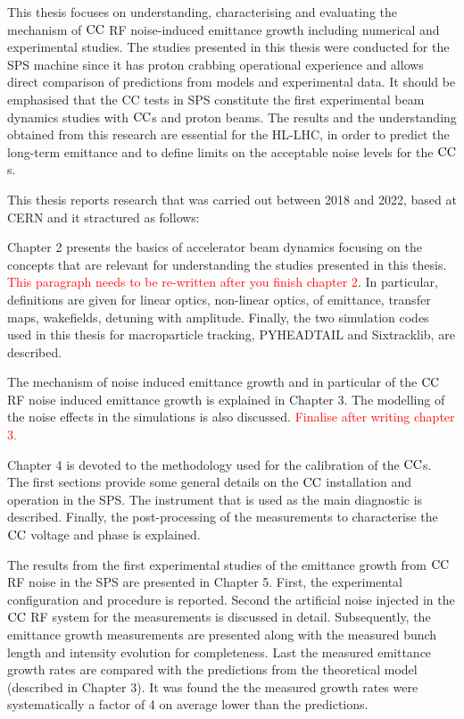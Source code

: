 This thesis focuses on understanding, characterising and evaluating the mechanism of ${\mathrm{CC}}$ RF noise-induced emittance growth including numerical and experimental studies. The studies presented in this thesis were conducted for the SPS machine since it has proton crabbing operational experience and allows direct comparison of predictions from models and experimental data. It should be emphasised that the CC tests in SPS constitute the first experimental beam dynamics studies with ${\mathrm{CC}}$s and proton beams. The results and the understanding obtained from this research are essential for the HL-LHC, in order to predict the long-term emittance and to define limits on the acceptable noise levels for the ${\mathrm{CC}}$s.

This thesis reports research that was carried out between 2018 and 2022, based at CERN and it stractured as follows:

Chapter 2 presents the basics of accelerator beam dynamics focusing on the concepts that are relevant for understanding the studies presented in this thesis. \textcolor{red}{This paragraph needs to be re-written after you finish chapter 2}. In particular, definitions are given for linear optics, non-linear optics, of emittance, transfer maps, wakefields, detuning with amplitude.  Finally, the two simulation codes used in this thesis for macroparticle tracking, PYHEADTAIL and Sixtracklib, are described.

The mechanism of noise induced emittance growth and in particular of the ${\mathrm{CC}}$ RF noise induced emittance growth is explained in Chapter 3. The modelling of the noise effects in the simulations is also discussed.  \textcolor{red}{Finalise after writing chapter 3.}

Chapter 4 is devoted to the methodology used for the calibration of the ${\mathrm{CC}}$s. The first sections provide some general details on the ${\mathrm{CC}}$ installation and operation in the SPS. The instrument that is used as the main diagnostic is described. Finally, the post-processing of the measurements to characterise the ${\mathrm{CC}}$ voltage and phase is explained. %

The results from the first experimental studies of the emittance growth from ${\mathrm{CC}}$ RF noise in the SPS are presented in Chapter 5. First, the experimental configuration and procedure is reported. Second the artificial noise injected in the ${\mathrm{CC}}$ RF system for the measurements is discussed in detail. Subsequently, the emittance growth measurements are presented along with the measured bunch length and intensity evolution for completeness. Last the measured emittance growth rates are compared with the predictions from the theoretical model (described in Chapter 3). It was found the the measured growth rates were systematically a factor of 4 on average lower than the predictions. 

